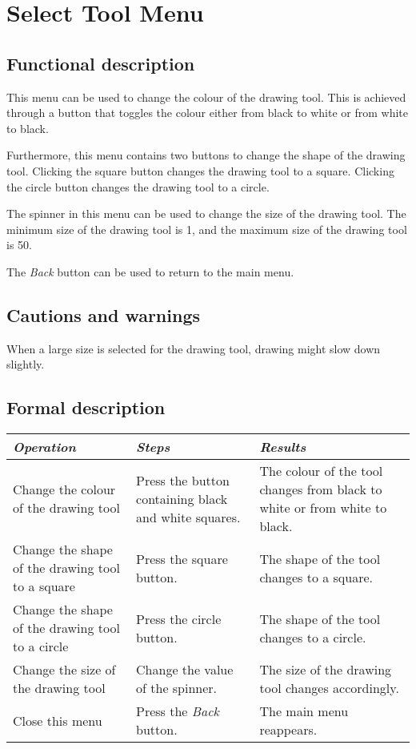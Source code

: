 \section{Select Tool Menu}\label{sec:selecttoolmenu}
  \subsection*{Functional description}
  This menu can be used to change the colour of the drawing tool. This is achieved through a button that toggles the colour either from black to white or from white to black.
  
  Furthermore, this menu contains two buttons to change the shape of the drawing tool. Clicking the square button changes the drawing tool to a square. Clicking the circle button changes the drawing tool to a circle.
  
  The spinner in this menu can be used to change the size of the drawing tool. The minimum size of the drawing tool is 1, and the maximum size of the drawing tool is 50.
  
  The \emph{Back} button can be used to return to the main menu.

  \subsection*{Cautions and warnings}
  When a large size is selected for the drawing tool, drawing might slow down slightly.

  \subsection*{Formal description}
  \begin{tabularx}{\textwidth}{XXX}
    \toprule
    \emph{Operation} & \emph{Steps} & \emph{Results} \\
    \midrule
    Change the colour of the drawing tool & Press the button containing black and white squares. & The colour of the tool changes from black to white or from white to black. \\
    \midrule
    Change the shape of the drawing tool to a square & Press the square button. & The shape of the tool changes to a square. \\
    \midrule
    Change the shape of the drawing tool to a circle & Press the circle button. & The shape of the tool changes to a circle. \\
    \midrule
    Change the size of the drawing tool & Change the value of the spinner. & The size of the drawing tool changes accordingly. \\ 
    \midrule
    Close this menu & Press the \emph{Back} button. & The main menu reappears. \\
    \bottomrule
  \end{tabularx}

